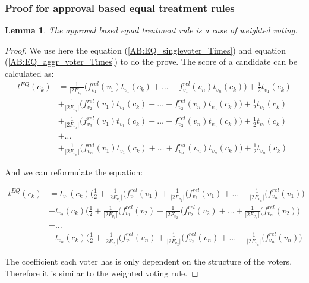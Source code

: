 \documentclass{article}
\newtheorem{lemma}[theorem]{Lemma}
\begin{document}
\subsubsection{Proof for approval based equal treatment rules}
\begin{lemma}
The approval based equal treatment rule is a case of weighted voting.
\end{lemma}

\begin{proof}
We use here the equation  (\ref{AB:EQ_singlevoter_Times})  and equation (\ref{AB:EQ_aggr_voter_Times})  to do the prove. The score of a candidate can be calculated as:
\begin{equation*}
\begin{split}
t^{EQ}(c_k) &= \frac{1}{\vert 2F_{v_1}\vert}\big(f_{v_1}^{rel}(v_1)t_{v_1}(c_k) + \dots + f_{v_1}^{rel}(v_n)t_{v_n}(c_k)\big) + \frac{1}{2}t_{v_1}(c_k)\\
            &+ \frac{1}{\vert 2F_{v_2}\vert}\big(f_{v_2}^{rel}(v_1)t_{v_1}(c_k) + \dots + f_{v_2}^{rel}(v_n)t_{v_n}(c_k)\big) + \frac{1}{2}t_{v_2}(c_k) \\
            &+ \frac{1}{\vert 2F_{v_3}\vert}\big(f_{v_3}^{rel}(v_1)t_{v_1}(c_k) + \dots + f_{v_3}^{rel}(v_n)t_{v_n}(c_k)\big) + \frac{1}{2}t_{v_3}(c_k) \\
            &+ \dots \\ 
            &+ \frac{1}{\vert 2F_{v_n}\vert}\big(f_{v_n}^{rel}(v_1)t_{v_1}(c_k) + \dots + f_{v_n}^{rel}(v_n)t_{v_n}(c_k)\big) +    \frac{1}{2}t_{v_n}(c_k)
\end{split}
\end{equation*}

And we can reformulate the equation:

\begin{equation*}
\begin{split}
t^{EQ}(c_k) &= t_{v_1}(c_k)\big(\frac{1}{2}+\frac{1}{\vert 2F_{v_1}\vert}(f_{v_1}^{rel}(v_1) +  \frac{1}{\vert 2F_{v_2}\vert}(f_{v_2}^{rel}(v_1)+ \dots +\frac{1}{\vert 2F_{v_n}\vert}(f_{v_n}^{rel}(v_1)\big) \\
            &+ t_{v_2}(c_k)\big(\frac{1}{2}+\frac{1}{\vert 2F_{v_1}\vert}(f_{v_1}^{rel}(v_2) +  \frac{1}{\vert 2F_{v_2}\vert}(f_{v_2}^{rel}(v_2)+ \dots +\frac{1}{\vert 2F_{v_n}\vert}(f_{v_n}^{rel}(v_2)\big) \\
             &+  \dots  \\
            &+ t_{v_n}(c_k)\big(\frac{1}{2}+\frac{1}{\vert 2F_{v_1}\vert}(f_{v_1}^{rel}(v_n) +  \frac{1}{\vert 2F_{v_2}\vert}(f_{v_2}^{rel}(v_n)+ \dots +\frac{1}{\vert 2F_{v_n}\vert}(f_{v_n}^{rel}(v_n)\big) 
\end{split}
\end{equation*}

The coefficient each voter has is only dependent on the structure of the voters. Therefore it is similar to the weighted voting rule.
\end{proof}
\end{document}
